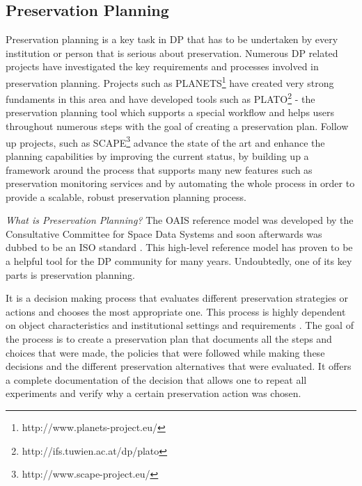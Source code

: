 \subsection{Preservation Planning}
Preservation planning is a key task in DP that has to be undertaken by every institution or person that is serious about preservation. Numerous DP related projects have investigated the key requirements and processes involved in preservation planning. Projects such as PLANETS\footnote{http://www.planets-project.eu/} have created very strong fundaments in this area and have developed tools such as PLATO\footnote{http://ifs.tuwien.ac.at/dp/plato} - the preservation planning tool which supports a special workflow and helps users throughout numerous steps with the goal of creating a preservation plan. Follow up projects, such as SCAPE\footnote{http://www.scape-project.eu/} advance the state of the art and enhance the planning capabilities by improving the current status, by building up a framework around the process that supports many new features such as preservation monitoring services and by automating the whole process in order to provide a scalable, robust preservation planning process.\newline

\noindent\textit{What is Preservation Planning?}\newline
The OAIS reference model was developed by the Consultative Committee for Space Data Systems and soon afterwards was dubbed to be an ISO standard \cite{iso:2003:oais}. This high-level reference model has proven to be a helpful tool for the DP community for many years. Undoubtedly, one of its key parts is preservation planning.

It is a decision making process that evaluates different preservation strategies or actions and chooses the most appropriate one. This process is highly dependent on object characteristics and institutional settings and requirements \cite{STR07_jcdl}. The goal of the process is to create a preservation plan that documents all the steps and choices that were made, the policies that were followed while making these decisions and the different preservation alternatives that were evaluated. It offers a complete documentation of the decision that allows one to repeat all experiments and verify why a certain preservation action was chosen.


